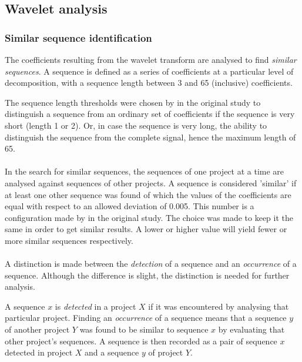 \subsection{Wavelet analysis}
\subsubsection{Similar sequence identification}
The coefficients resulting from the wavelet transform are analysed to find
\textit{similar sequences}. A sequence is defined as a series of coefficients
at a particular level of decomposition, with a sequence length between 3 and 65
(inclusive) coefficients.

The sequence length thresholds were chosen by \citet{karus2013} in the original
study to distinguish a sequence from an ordinary set of coefficients if the
sequence is very short (length 1 or 2). Or, in case the sequence is very long,
the ability to distinguish the sequence from the complete signal, hence the
maximum length of 65.

\paragraph{}
In the search for similar sequences, the sequences of one project at a time are
analysed against sequences of other projects. A sequence is considered
'similar' if at least one other sequence was found of which the values of the
coefficients are equal with respect to an allowed deviation of 0.005. This
number is a configuration made by \citeauthor{karus2013} in the original study.
The choice was made to keep it the same in order to get similar results.
A lower or higher value will yield fewer or more similar sequences
respectively.

\paragraph{}
A distinction is made between the \textit{detection} of a sequence and an
\textit{occurrence} of a sequence. Although the difference is slight, the
distinction is needed for further analysis.

A sequence $x$ is \textit{detected} in a project $X$ if it was encountered by
analysing that particular project. Finding an \textit{occurrence} of a sequence
means that a sequence $y$  of another project $Y$ was found to be similar to
sequence $x$ by evaluating that other project's sequences. A sequence is then
recorded as a pair of sequence $x$ detected in project $X$ and a sequence $y$
of project $Y$.

